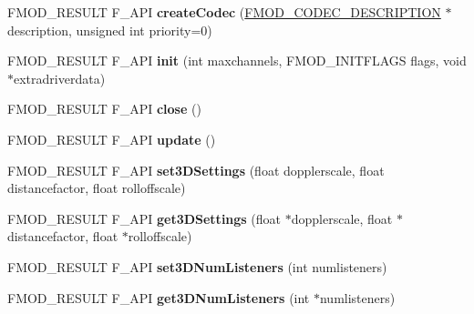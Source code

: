 \begin{DoxyCompactItemize}
\item 
\hypertarget{class_f_m_o_d_1_1_system_a6855d31fda8b1b9318c15498762c2380}{F\-M\-O\-D\-\_\-\-R\-E\-S\-U\-L\-T F\-\_\-\-A\-P\-I {\bfseries create\-Codec} (\hyperlink{struct_f_m_o_d___c_o_d_e_c___d_e_s_c_r_i_p_t_i_o_n}{F\-M\-O\-D\-\_\-\-C\-O\-D\-E\-C\-\_\-\-D\-E\-S\-C\-R\-I\-P\-T\-I\-O\-N} $\ast$description, unsigned int priority=0)}\label{class_f_m_o_d_1_1_system_a6855d31fda8b1b9318c15498762c2380}

\item 
\hypertarget{class_f_m_o_d_1_1_system_a0f8f7c5f25875362ff9d822ca894857a}{F\-M\-O\-D\-\_\-\-R\-E\-S\-U\-L\-T F\-\_\-\-A\-P\-I {\bfseries init} (int maxchannels, F\-M\-O\-D\-\_\-\-I\-N\-I\-T\-F\-L\-A\-G\-S flags, void $\ast$extradriverdata)}\label{class_f_m_o_d_1_1_system_a0f8f7c5f25875362ff9d822ca894857a}

\item 
\hypertarget{class_f_m_o_d_1_1_system_af8b6c4c677e44197657893de01383169}{F\-M\-O\-D\-\_\-\-R\-E\-S\-U\-L\-T F\-\_\-\-A\-P\-I {\bfseries close} ()}\label{class_f_m_o_d_1_1_system_af8b6c4c677e44197657893de01383169}

\item 
\hypertarget{class_f_m_o_d_1_1_system_a52538b2fe55918c1575ff22bbfab48d6}{F\-M\-O\-D\-\_\-\-R\-E\-S\-U\-L\-T F\-\_\-\-A\-P\-I {\bfseries update} ()}\label{class_f_m_o_d_1_1_system_a52538b2fe55918c1575ff22bbfab48d6}

\item 
\hypertarget{class_f_m_o_d_1_1_system_a107414e588b619f0883570efa92da2ca}{F\-M\-O\-D\-\_\-\-R\-E\-S\-U\-L\-T F\-\_\-\-A\-P\-I {\bfseries set3\-D\-Settings} (float dopplerscale, float distancefactor, float rolloffscale)}\label{class_f_m_o_d_1_1_system_a107414e588b619f0883570efa92da2ca}

\item 
\hypertarget{class_f_m_o_d_1_1_system_a3d437ae627c22704714a274c310b8966}{F\-M\-O\-D\-\_\-\-R\-E\-S\-U\-L\-T F\-\_\-\-A\-P\-I {\bfseries get3\-D\-Settings} (float $\ast$dopplerscale, float $\ast$distancefactor, float $\ast$rolloffscale)}\label{class_f_m_o_d_1_1_system_a3d437ae627c22704714a274c310b8966}

\item 
\hypertarget{class_f_m_o_d_1_1_system_a33a3a5b785baf3eb09a7428ea2beb495}{F\-M\-O\-D\-\_\-\-R\-E\-S\-U\-L\-T F\-\_\-\-A\-P\-I {\bfseries set3\-D\-Num\-Listeners} (int numlisteners)}\label{class_f_m_o_d_1_1_system_a33a3a5b785baf3eb09a7428ea2beb495}

\item 
\hypertarget{class_f_m_o_d_1_1_system_a6909226f2d3f918a3a6900e35476cdbc}{F\-M\-O\-D\-\_\-\-R\-E\-S\-U\-L\-T F\-\_\-\-A\-P\-I {\bfseries get3\-D\-Num\-Listeners} (int $\ast$numlisteners)}\label{class_f_m_o_d_1_1_system_a6909226f2d3f918a3a6900e35476cdbc}


\end{DoxyCompactItemize}
